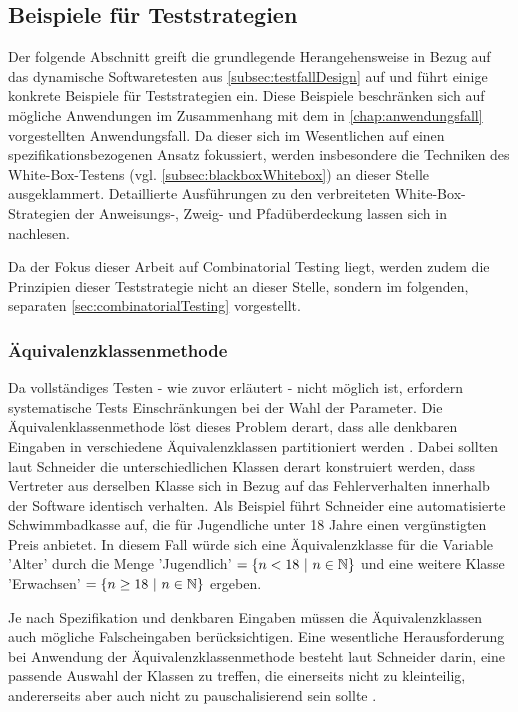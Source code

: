 \subsection{Beispiele für Teststrategien}\label{subsec:beispieleTests}

Der folgende Abschnitt greift die grundlegende Herangehensweise in Bezug auf das dynamische Softwaretesten aus \autoref{subsec:testfallDesign} auf und führt einige konkrete Beispiele für Teststrategien ein. Diese Beispiele beschränken sich auf mögliche Anwendungen im Zusammenhang mit dem in \autoref{chap:anwendungsfall} vorgestellten Anwendungsfall. Da dieser sich im Wesentlichen auf einen spezifikationsbezogenen Ansatz fokussiert, werden insbesondere die Techniken des White-Box-Testens (vgl. \autoref{subsec:blackboxWhitebox}) an dieser Stelle ausgeklammert. Detaillierte Ausführungen zu den verbreiteten White-Box-Strategien der Anweisungs-, Zweig- und Pfadüberdeckung lassen sich in \cite[S. 108 ff.]{schneider2012abenteuer} nachlesen.

Da der Fokus dieser Arbeit auf Combinatorial Testing liegt, werden zudem die Prinzipien dieser Teststrategie nicht an dieser Stelle, sondern im folgenden, separaten \autoref{sec:combinatorialTesting} vorgestellt.

\subsubsection{Äquivalenzklassenmethode}

Da vollständiges Testen - wie zuvor erläutert - nicht möglich ist, erfordern systematische Tests Einschränkungen bei der Wahl der Parameter. Die Äquivalenklassenmethode löst dieses Problem derart, dass alle denkbaren Eingaben in verschiedene Äquivalenzklassen partitioniert werden \cite[S. 94]{schneider2012abenteuer}. Dabei sollten laut Schneider \cite[S. 94 ff.]{schneider2012abenteuer} die unterschiedlichen Klassen derart konstruiert werden, dass Vertreter aus derselben Klasse sich in Bezug auf das Fehlerverhalten innerhalb der Software identisch verhalten. Als Beispiel führt Schneider eine automatisierte Schwimmbadkasse auf, die für Jugendliche unter 18 Jahre einen vergünstigten Preis anbietet. In diesem Fall würde sich eine Äquivalenzklasse für die Variable 'Alter' durch die Menge 'Jugendlich' $= \{n < 18 ~ | ~ n \in \mathbb{N}\}$ und eine weitere Klasse 'Erwachsen' $= \{n \geq 18 ~ | ~ n \in \mathbb{N}\}$ ergeben. 

Je nach Spezifikation und denkbaren Eingaben müssen die Äquivalenzklassen auch mögliche Falscheingaben berücksichtigen. Eine wesentliche Herausforderung bei Anwendung der Äquivalenzklassenmethode besteht laut Schneider darin, eine passende Auswahl der Klassen zu treffen, die einerseits nicht zu kleinteilig, andererseits aber auch nicht zu pauschalisierend sein sollte \cite[S. 95]{schneider2012abenteuer}.

